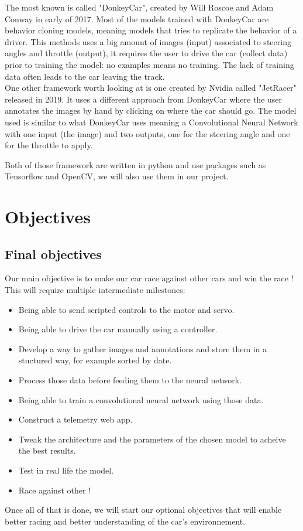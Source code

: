 \documentclass[12pt]{article}
\begin{document}
The most known is called "DonkeyCar", created by Will Roscoe and Adam Conway in early of 2017. Most of the models trained with DonkeyCar are behavior cloning models, meaning models that tries to replicate the behavior of a driver. This methods uses a big amount of images (input) associated to steering angles and throttle (output), it requires the user to drive the car (collect data) prior to training the model: no examples means no training. The lack of training data often leads to the car leaving the track.\\

One other framework worth looking at is one created by Nvidia called "JetRacer" released in 2019. It uses a different approach from DonkeyCar where the user annotates the images by hand by clicking on where the car should go. The model used is similar to what DonkeyCar uses meaning a Convolutional Neural Network with one input (the image) and two outputs, one for the steering angle and one for the throttle to apply.

Both of those framework are written in python and use packages such as Tensorflow and OpenCV, we will also use them in our project.

\section{Objectives}

\subsection{Final objectives}
Our main objective is to make our car race against other cars and win the race !
This will require multiple intermediate milestones:
\begin{itemize}
\item Being able to send scripted controls to the motor and servo.
\item Being able to drive the car manually using a controller.
\item Develop a way to gather images and annotations and store them in a stuctured way, for example sorted by date.
\item Process those data before feeding them to the neural network.
\item Being able to train a convolutional neural network using those data.
\item Construct a telemetry web app.
\item Tweak the architecture and the parameters of the chosen model to acheive the best results.
\item Test in real life the model.
\item Race against other !
\end{itemize}
Once all of that is done, we will start our optional objectives that will enable better racing and better understanding of the car's environnement.
\end{document}
